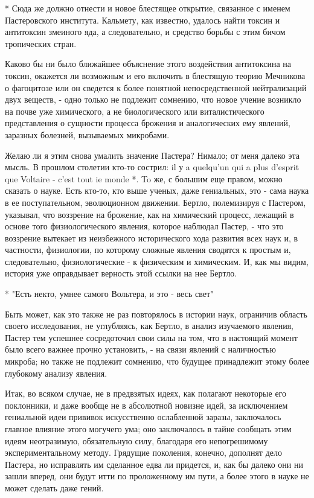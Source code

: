 * Сюда же должно отнести и новое блестящее открытие, связанное с
именем Пастеровского института. Кальмету, как известно, удалось найти
токсин и антитоксин змеиного яда, а следовательно, и средство борьбы с
этим бичом тропических стран.

Каково бы ни было ближайшее объяснение этого воздействия антитоксина  на
токсин,  окажется  ли  возможным  и  его  включить  в  блестящую  теорию
Мечникова о фагоцитозе или он сведется к более понятной непосредственной
нейтрализаций двух  веществ, -  одно только  не подлежит  сомнению,  что
новое учение возникло на почве уже химического, а не биологического  или
виталистического  представления   о   сущности   процесса   брожения   и
аналогических ему явлений, заразных болезней, вызываемых микробами.

Желаю ли я этим снова умалить  значение Пастера? Нимало; от меня  далеко
эта мысль. В  прошлом столетии кто-то  сострил: il у  a quelqu'un qui  a
plus d'esprit que Voltaire - c'est tout ie monde *. To же, с большим еще
правом, можно  сказать  о науке.  Есть  кто-то, кто  выше  ученых,  даже
гениальных, это - сама наука в ее поступательном, эволюционном движении.
Бертло, полемизируя с Пастером, указывал, что воззрение на брожение, как
на химический процесс, лежащий  в основе того физиологического  явления,
которое наблюдал Пастер,  - что  это воззрение  вытекает из  неизбежного
исторического хода развития  всех наук  и, в  частности, физиологии,  по
которому  сложные   явления  сводятся   к  простым   и,   следовательно,
физиологические - к физическим  и химическим. И,  как мы видим,  история
уже оправдывает верность этой ссылки на нее Бертло.

* "Есть некто, умнее самого Вольтера, и это - весь свет"

Быть может, как это также не  раз повторялось в истории наук,  ограничив
область  своего  исследования,  не  углубляясь,  как  Бертло,  в  анализ
изучаемого явления, Пастер тем успешнее  сосредоточил свои силы на  том,
что в настоящий момент было всего  важнее прочно установить, - на  связи
явлений с  наличностью  микроба;  но также  не  подлежит  сомнению,  что
будущее принадлежит этому более глубокому анализу явления.

Итак, во всяком случае,  не в предвзятых  идеях, как полагают  некоторые
его  поклонники,  и  даже  вообще  не  в  абсолютной  новизне  идей,  за
исключением гениальной  идеи прививок  искусственно ослабленной  заразы,
заключалось главное влияние этого могучего ума; оно заключалось в  тайне
сообщать  этим  идеям  неотразимую,  обязательную  силу,  благодаря  его
непогрешимому экспериментальному  методу. Грядущие  поколения,  конечно,
дополнят дело Пастера, но исправлять  им сделанное едва ли придется,  и,
как бы далеко  они ни зашли  вперед, они будут  итти по проложенному  им
пути, а более этого в науке не может сделать даже гений.

